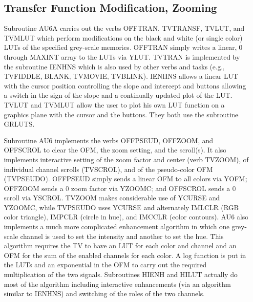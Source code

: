\subsection{Transfer Function Modification, Zooming}
Subroutine AU6A carries out the verbs OFFTRAN, TVTRANSF,
TVLUT, and TVMLUT which perform modifications on the black and white
(or single color) LUTs of the specified grey-scale memories. OFFTRAN
simply writes a linear, 0 through MAXINT array to the LUTs via YLUT.
TVTRAN is implemented by the subroutine IENHNS which is
also used by other verbs and tasks (e.g., TVFIDDLE, BLANK, TVMOVIE,
TVBLINK).  IENHNS allows a linear LUT with the cursor position
controlling the slope and intercept and buttons allowing a switch in
the sign of the slope and a continually updated plot of the LUT.
TVLUT and TVMLUT allow the user to plot his own LUT function on a
graphics plane with the cursor and the buttons.  They both use the
subroutine GRLUTS.

Subroutine AU6 implements the verbs OFFPSEUD, OFFZOOM, and
OFFSCROL to clear the OFM, the zoom setting, and the scroll(s). It
also implements interactive setting of the zoom factor and center
(verb TVZOOM), of individual channel scrolls (TVSCROL), and of the
pseudo-color OFM (TVPSEUDO).  OFFPSEUD simply sends a linear OFM to
all colors via YOFM; OFFZOOM sends a 0 zoom factor via YZOOMC; and
OFFSCROL sends a 0 scroll via YSCROL.  TVZOOM makes considerable use
of YCURSE and YZOOMC, while TVPSEUDO uses YCURSE and alternately
IMLCLR (RGB color triangle), IMPCLR
(circle in hue), and IMCCLR (color contours).  AU6 also
implements a much more complicated enhancement algorithm in which one
grey-scale channel is used to set the intensity and another to set the
hue.  This algorithm requires the TV to have an LUT for each color and
channel and an OFM for the sum of the enabled channels for each color.
A log function is put in the LUTs and an exponential in the OFM to
carry out the required multiplication of the two signals.  Subroutines
HIENH and HILUT actually do most of the
algorithm including interactive enhancements (via an algorithm similar
to IENHNS) and switching of the roles of the two channels.



